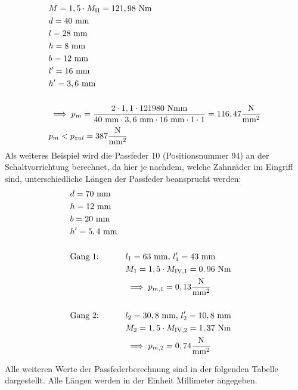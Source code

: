 \begin{itemize}
\begin{align*}
		&M= 1,5 \cdot M_{\mathrm{II}} = 121,98 \text{ Nm} \\
		&d= 40 \text{ mm} \\
		&l= 28 \text{ mm} \\
		&h= 8 \text{ mm} \\
		&b= 12 \text{ mm} \\
		&l'= 16 \text{ mm} \\
		&h'= 3,6 \text{ mm} \\ \\
		&\implies p_m = \frac{2 \cdot 1,1 \cdot 121980 \text{ Nmm}}{40 \text{ mm} \cdot 3,6 \text{ mm} \cdot 16 \text{ mm} \cdot 1 \cdot 1}  = 116,47 \frac{\text{N}}{\text{mm}^2}\\
		& p_m < p_{zul} = 387 \frac{\text{N}}{\text{mm}^2} \\
	\end{align*}
	Als weiteres Beispiel wird die Passfeder 10 (Positionsnummer 94) an der Schaltvorrichtung berechnet, da hier je nachdem, welche Zahnräder im Eingriff sind, unterschiedliche Längen der Passfeder beansprucht werden:
	\begin{align*}
	&d= 70 \text{ mm} &\\
	&h= 12 \text{ mm} &\\
	&b= 20 \text{ mm} &\\
	&h'= 5,4 \text{ mm}& \\ \\
	&\text{Gang 1:} &&l_1 = 63 \text{ mm, } l_1' = 43 \text{ mm}\\
	& && M_1 = 1,5 \cdot  M_{\mathrm{IV},1} = 0,96 \text{ Nm} \\
	& &&\implies p_{m,1} = 0,13\frac{\text{N}}{\text{mm}^2} \\ \\
	&\text{Gang 2:} &&l_2 = 30,8\text{ mm, } l_2' = 10,8 \text{ mm}\\
	& && M_2 = 1,5 \cdot  M_{\mathrm{IV},2} = 1,37 \text{ Nm} \\
	& &&\implies p_{m,2} = 0,74\frac{\text{N}}{\text{mm}^2} \\
	\end{align*}
\end{itemize}
\newpage
Alle weiteren Werte der Passfederberechnung sind in der folgenden Tabelle dargestellt. Alle Längen werden in der Einheit Millimeter angegeben. \\ \\

